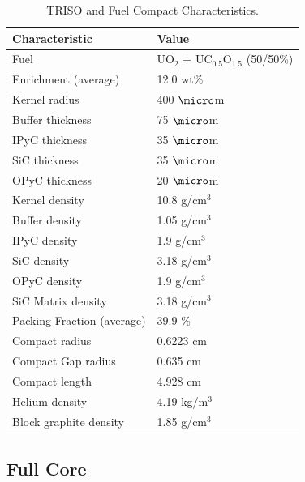 \documentclass[11pt,letterpaper]{article}
\begin{document}
	\begin{table}[]
		\centering
	    \caption{TRISO and Fuel Compact Characteristics.}
	    \label{tab:compact}
		\begin{tabular}{l|l}
		\hline
		Characteristic                   & Value                \\ \hline
		Fuel                             & UO$_2$ + UC$_{0.5}$O$_{1.5}$ (50/50\%)  \\
		Enrichment (average)             & 12.0 wt\%            \\
		Kernel radius                    & 400 $\micro$m        \\
		Buffer thickness                 & 75 $\micro$m         \\
		IPyC thickness                   & 35 $\micro$m         \\
		SiC thickness                    & 35 $\micro$m         \\
		OPyC thickness                   & 20 $\micro$m         \\
    	Kernel density                   & 10.8 g/cm$^3$        \\
		Buffer density                   & 1.05 g/cm$^3$        \\
		IPyC density                     & 1.9 g/cm$^3$         \\
		SiC density                      & 3.18 g/cm$^3$        \\
		OPyC density                     & 1.9 g/cm$^3$         \\
		SiC Matrix density               & 3.18 g/cm$^3$        \\
		Packing Fraction (average)       & 39.9 \%              \\
		
		Compact radius                   & 0.6223 cm            \\
		Compact Gap radius               & 0.635 cm             \\
		Compact length                   & 4.928 cm             \\ 
        Helium density           		 & 4.19 kg/m$^3$        \\
        Block graphite density           & 1.85 g/cm$^3$        \\ \hline

		\end{tabular}
	\end{table}

\subsection{Full Core}
\end{document}
